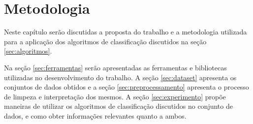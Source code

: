 \chapter{Metodologia}
\label{chap:metodologia}

Neste capítulo serão discutidas a proposta do trabalho e a metodologia utilizada para a aplicação dos algoritmos de classificação discutidos na seção \ref{sec:algoritmos}.

Na seção \ref{sec:ferramentas} serão apresentadas as ferramentas e bibliotecas utilizadas no desenvolvimento do trabalho. A seção \ref{sec:dataset} apresenta os conjuntos de dados obtidos e a seção \ref{sec:preprocessamento} apresenta o processo de limpeza e interpretação dos mesmos. A seção \ref{sec:experimento} propõe maneiras de utilizar os algoritmos de classificação discutidos no conjunto de dados, e como obter informações relevantes quanto a ambos.








